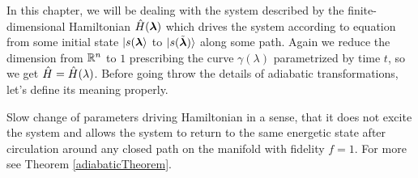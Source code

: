 In this chapter, we will be dealing with the system described by the finite-dimensional Hamiltonian $\hat{H}({\bm\lambda})$ which drives the system according to \Schrodinger equation from some initial state $\ket{s({\bm\lambda}}$ to $\ket{s(\tilde{{\bm\lambda}})}$ along some path. Again we reduce the dimension from $\mathbb{R}^n$ to $1$ prescribing the curve $\gamma(\lambda)$ parametrized by time $t$, so we get $\hat{H}=\hat{H}(\lambda)$. Before going throw the details of adiabatic transformations, let's define its meaning properly.

\begin{definition}[Adibaticity]
    Slow change of parameters driving Hamiltonian in a sense, that it does not excite the system and allows the system to return to the same energetic state after circulation around any closed path on the manifold with fidelity $f=1$. For more see Theorem \ref{adiabaticTheorem}.
\end{definition}


